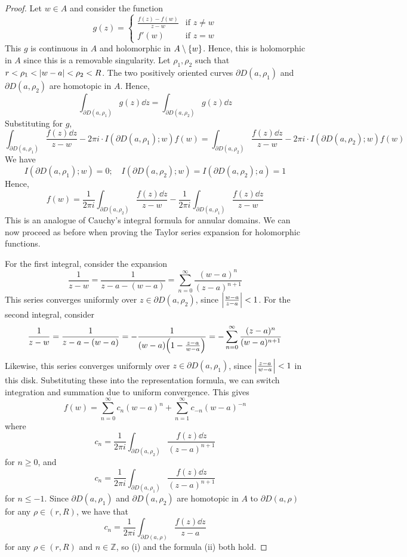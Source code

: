 \begin{proof}
	Let \( w \in A \) and consider the function
	\[ g(z) = \begin{cases}
		\frac{f(z) - f(w)}{z-w} & \text{if } z \neq w \\
		f'(w) & \text{if } z = w
	\end{cases} \]
	This \( g \) is continuous in \( A \) and holomorphic in \( A \setminus \qty{w} \).
	Hence, this is holomorphic in \( A \) since this is a removable singularity.
	Let \( \rho_1, \rho_2 \) such that \( r < \rho_1 < \abs{w - a} < \rho_2 < R \).
	The two positively oriented curves \( \partial D(a,\rho_1) \) and \( \partial D(a,\rho_2) \) are homotopic in \( A \).
	Hence,
	\[ \int_{\partial D(a,\rho_1)} g(z) \dd{z} = \int_{\partial D(a,\rho_2)} g(z) \dd{z} \]
	Substituting for \( g \),
	\[ \int_{\partial D(a,\rho_1)} \frac{f(z) \dd{z}}{z-w} - 2\pi i \cdot I(\partial D(a,\rho_1);w) f(w) = \int_{\partial D(a,\rho_2)} \frac{f(z) \dd{z}}{z-w} - 2\pi i \cdot I(\partial D(a,\rho_2);w) f(w) \]
	We have
	\[ I(\partial D(a,\rho_1);w) = 0;\quad I(\partial D(a,\rho_2);w) = I(\partial D(a,\rho_2);a) = 1 \]
	Hence,
	\[ f(w) = \frac{1}{2\pi i} \int_{\partial D(a,\rho_2)} \frac{f(z) \dd{z}}{z-w} - \frac{1}{2\pi i}\int_{\partial D(a,\rho_1)} \frac{f(z) \dd{z}}{z-w} \]
	This is an analogue of Cauchy's integral formula for annular domains.
	We can now proceed as before when proving the Taylor series expansion for holomorphic functions.

	For the first integral, consider the expansion
	\[ \frac{1}{z-w} = \frac{1}{z-a-(w-a)} = \sum_{n=0}^\infty \frac{(w-a)^n}{(z-a)^{n+1}} \]
	This series converges uniformly over \( z \in \partial D(a,\rho_2) \), since \( \abs{\frac{w-a}{z-a}} < 1 \).
	For the second integral, consider
	\[ \frac{1}{z-w} = \frac{1}{z-a-(w-a)} = -\frac{1}{(w-a)\qty(1-\frac{z-a}{w-a})} = -\sum_{n=0}^\infty \frac{(z-a)^n}{(w-a)^{n+1}} \]
	Likewise, this series converges uniformly over \( z \in \partial D(a,\rho_1) \), since \( \abs{\frac{z-a}{w-a}} < 1 \) in this disk.
	Substituting these into the representation formula, we can switch integration and summation due to uniform convergence.
	This gives
	\[ f(w) = \sum_{n=0}^\infty c_n (w-a)^n + \sum_{n=1}^\infty c_{-n} (w-a)^{-n} \]
	where
	\[ c_n = \frac{1}{2\pi i} \int_{\partial D(a,\rho_2)} \frac{f(z) \dd{z}}{(z-a)^{n+1}} \]
	for \( n \geq 0 \), and
	\[ c_n = \frac{1}{2\pi i} \int_{\partial D(a,\rho_1)} \frac{f(z) \dd{z}}{(z-a)^{n+1}} \]
	for \( n \leq -1 \).
	Since \( \partial D(a,\rho_1) \) and \( \partial D(a,\rho_2) \) are homotopic in \( A \) to \( \partial D(a,\rho) \) for any \( \rho \in (r,R) \), we have that
	\[ c_n = \frac{1}{2\pi i} \int_{\partial D(a,\rho)} \frac{f(z) \dd{z}}{z-a} \]
	for any \( \rho \in (r,R) \) and \( n \in \mathbb Z \), so (i) and the formula (ii) both hold.


\end{proof}
